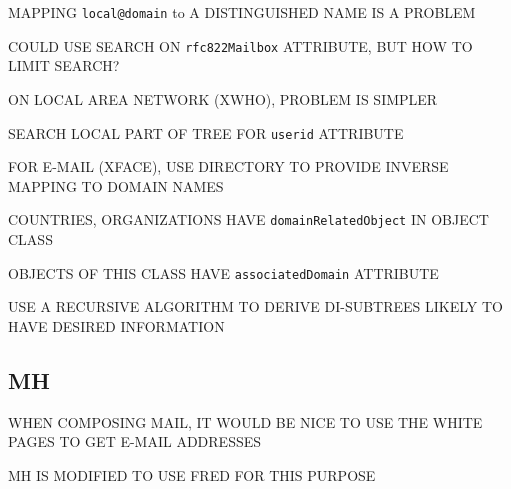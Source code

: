 \begin{bwslide}

\begin{nrtc}
\item	MAPPING \verb"local@domain" to A DISTINGUISHED NAME IS A PROBLEM

\item	COULD USE SEARCH ON \verb"rfc822Mailbox" ATTRIBUTE,
	BUT HOW TO LIMIT SEARCH? 

\item	ON LOCAL AREA NETWORK (XWHO), PROBLEM IS SIMPLER
    \begin{nrtc}
    \item	SEARCH LOCAL PART OF TREE FOR \verb"userid" ATTRIBUTE
    \end{nrtc}

\item	FOR E-MAIL (XFACE), USE DIRECTORY TO PROVIDE INVERSE MAPPING TO
	DOMAIN NAMES
    \begin{nrtc}
    \item	COUNTRIES, ORGANIZATIONS HAVE \verb"domainRelatedObject" IN
		OBJECT CLASS

    \item	OBJECTS OF THIS CLASS HAVE \verb"associatedDomain" ATTRIBUTE

    \item	USE A RECURSIVE ALGORITHM TO DERIVE DI-SUBTREES LIKELY TO HAVE
		DESIRED INFORMATION
    \end{nrtc}
\end{nrtc}
\end{bwslide}


\begin{bwslide}
\part*	{MH}\bf

\begin{nrtc}
\item	WHEN COMPOSING MAIL, IT WOULD BE NICE TO USE THE WHITE PAGES TO GET
	E-MAIL ADDRESSES

\item	MH IS MODIFIED TO USE FRED FOR THIS PURPOSE
\end{nrtc}
\end{bwslide}


